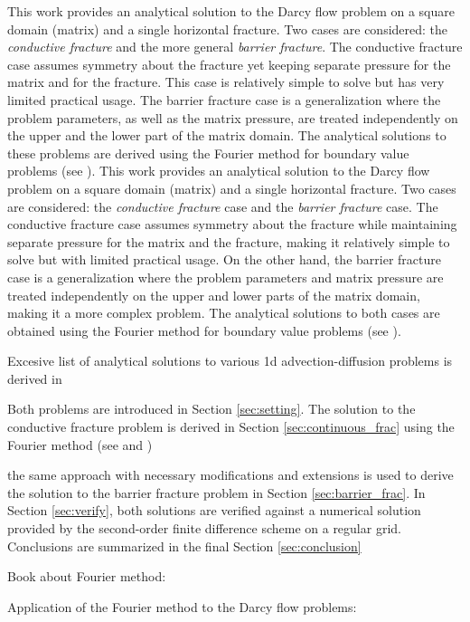 \documentclass[sn-mathphys,Numbered]{sn-jnl}
\begin{document}
This work provides an analytical solution to the Darcy flow problem on a square domain (matrix) and a single horizontal fracture. Two cases are considered: the {\it conductive fracture} and the more general {\it barrier fracture}.
The conductive fracture case assumes symmetry about the fracture yet keeping separate pressure for the matrix and for the fracture. 
This case is relatively simple to solve but has very limited practical usage.
The barrier fracture case is a generalization where the problem parameters, as well as the matrix pressure, are treated independently on the upper and the lower part of the matrix domain. 
The analytical solutions to these problems are derived using the Fourier method for boundary value problems (see \cite{Brown1993}).
This work provides an analytical solution to the Darcy flow problem on a square domain (matrix) and a single horizontal fracture. Two cases are considered: the {\it conductive fracture} case and the {\it barrier fracture} case. The conductive fracture case assumes symmetry about the fracture while maintaining separate pressure for the matrix and the fracture, making it relatively simple to solve but with limited practical usage. On the other hand, the barrier fracture case is a generalization where the problem parameters and matrix pressure are treated independently on the upper and lower parts of the matrix domain, making it a more complex problem. The analytical solutions to both cases are obtained using the Fourier method for boundary value problems (see \cite{Brown1993}).


Excesive list of analytical solutions to various 1d advection-diffusion problems is derived in \cite{Genuchten1982}
 
 Both problems are introduced in Section \ref{sec:setting}.
The solution to the conductive fracture problem is derived in Section \ref{sec:continuous_frac}
using the Fourier method (see \cite{Brown1993} and \cite{Onder1998})

the same approach with necessary modifications and extensions
is used to derive the solution to the barrier fracture problem in Section \ref{sec:barrier_frac}. In Section \ref{sec:verify}, 
both solutions are verified against a numerical solution provided by the second-order finite difference scheme on a regular grid. 
Conclusions are summarized in the final Section \ref{sec:conclusion} 


Book about Fourier method:
\cite{Brown1993}

Application of the Fourier method to the Darcy flow problems: \cite{Onder1998}
\end{document}
